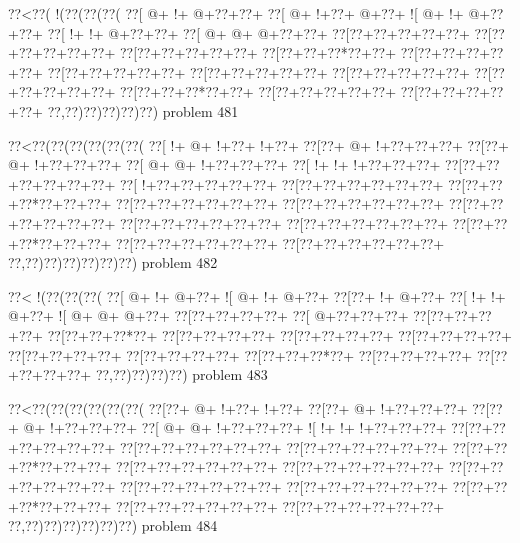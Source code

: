 \vbox{\vbox{\goo
\0??<\0??(\- !(\0??(\0??(\0??(
\0??[\- @+\- !+\- @+\0??+\0??+
\0??[\- @+\- !+\0??+\- @+\0??+
\- ![\- @+\- !+\- @+\0??+\0??+
\0??[\- !+\- !+\- @+\0??+\0??+
\0??[\- @+\- @+\- @+\0??+\0??+
\0??[\0??+\0??+\0??+\0??+\0??+
\0??[\0??+\0??+\0??+\0??+\0??+
\0??[\0??+\0??+\0??+\0??+\0??+
\0??[\0??+\0??+\0??*\0??+\0??+
\0??[\0??+\0??+\0??+\0??+\0??+
\0??[\0??+\0??+\0??+\0??+\0??+
\0??[\0??+\0??+\0??+\0??+\0??+
\0??[\0??+\0??+\0??+\0??+\0??+
\0??[\0??+\0??+\0??+\0??+\0??+
\0??[\0??+\0??+\0??*\0??+\0??+
\0??[\0??+\0??+\0??+\0??+\0??+
\0??[\0??+\0??+\0??+\0??+\0??+
\0??,\0??)\0??)\0??)\0??)\0??)
}
\hfil problem 481\hfil\break
}

\vbox{\vbox{\goo
\0??<\0??(\0??(\0??(\0??(\0??(\0??(
\0??[\- !+\- @+\- !+\0??+\- !+\0??+
\0??[\0??+\- @+\- !+\0??+\0??+\0??+
\0??[\0??+\- @+\- !+\0??+\0??+\0??+
\0??[\- @+\- @+\- !+\0??+\0??+\0??+
\0??[\- !+\- !+\- !+\0??+\0??+\0??+
\0??[\0??+\0??+\0??+\0??+\0??+\0??+
\0??[\- !+\0??+\0??+\0??+\0??+\0??+
\0??[\0??+\0??+\0??+\0??+\0??+\0??+
\0??[\0??+\0??+\0??*\0??+\0??+\0??+
\0??[\0??+\0??+\0??+\0??+\0??+\0??+
\0??[\0??+\0??+\0??+\0??+\0??+\0??+
\0??[\0??+\0??+\0??+\0??+\0??+\0??+
\0??[\0??+\0??+\0??+\0??+\0??+\0??+
\0??[\0??+\0??+\0??+\0??+\0??+\0??+
\0??[\0??+\0??+\0??*\0??+\0??+\0??+
\0??[\0??+\0??+\0??+\0??+\0??+\0??+
\0??[\0??+\0??+\0??+\0??+\0??+\0??+
\0??,\0??)\0??)\0??)\0??)\0??)\0??)
}
\hfil problem 482\hfil\break
}

\vbox{\vbox{\goo
\0??<\- !(\0??(\0??(\0??(
\0??[\- @+\- !+\- @+\0??+
\- ![\- @+\- !+\- @+\0??+
\0??[\0??+\- !+\- @+\0??+
\0??[\- !+\- !+\- @+\0??+
\- ![\- @+\- @+\- @+\0??+
\0??[\0??+\0??+\0??+\0??+
\0??[\- @+\0??+\0??+\0??+
\0??[\0??+\0??+\0??+\0??+
\0??[\0??+\0??+\0??*\0??+
\0??[\0??+\0??+\0??+\0??+
\0??[\0??+\0??+\0??+\0??+
\0??[\0??+\0??+\0??+\0??+
\0??[\0??+\0??+\0??+\0??+
\0??[\0??+\0??+\0??+\0??+
\0??[\0??+\0??+\0??*\0??+
\0??[\0??+\0??+\0??+\0??+
\0??[\0??+\0??+\0??+\0??+
\0??,\0??)\0??)\0??)\0??)
}
\hfil problem 483\hfil\break
}

\vbox{\vbox{\goo
\0??<\0??(\0??(\0??(\0??(\0??(\0??(
\0??[\0??+\- @+\- !+\0??+\- !+\0??+
\0??[\0??+\- @+\- !+\0??+\0??+\0??+
\0??[\0??+\- @+\- !+\0??+\0??+\0??+
\0??[\- @+\- @+\- !+\0??+\0??+\0??+
\- ![\- !+\- !+\- !+\0??+\0??+\0??+
\0??[\0??+\0??+\0??+\0??+\0??+\0??+
\0??[\0??+\0??+\0??+\0??+\0??+\0??+
\0??[\0??+\0??+\0??+\0??+\0??+\0??+
\0??[\0??+\0??+\0??*\0??+\0??+\0??+
\0??[\0??+\0??+\0??+\0??+\0??+\0??+
\0??[\0??+\0??+\0??+\0??+\0??+\0??+
\0??[\0??+\0??+\0??+\0??+\0??+\0??+
\0??[\0??+\0??+\0??+\0??+\0??+\0??+
\0??[\0??+\0??+\0??+\0??+\0??+\0??+
\0??[\0??+\0??+\0??*\0??+\0??+\0??+
\0??[\0??+\0??+\0??+\0??+\0??+\0??+
\0??[\0??+\0??+\0??+\0??+\0??+\0??+
\0??,\0??)\0??)\0??)\0??)\0??)\0??)
}
\hfil problem 484\hfil\break
}


